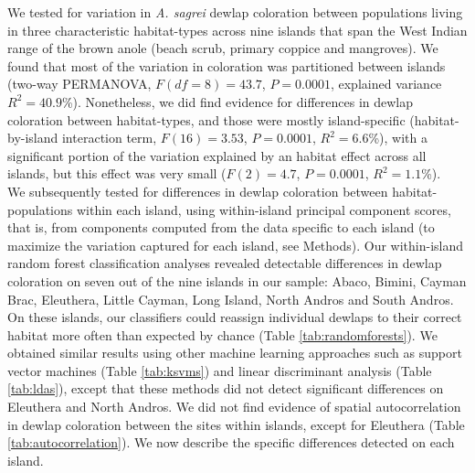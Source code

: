 
We tested for variation in \textit{A. sagrei} dewlap coloration between populations living in three characteristic habitat-types across nine islands that span the West Indian range of the brown anole (beach scrub, primary coppice and mangroves). We found that most of the variation in coloration was partitioned between islands (two-way PERMANOVA, $F(df = 8) = 43.7$, $P = 0.0001$, explained variance $R^2 = 40.9$\%). Nonetheless, we did find evidence for differences in dewlap coloration between habitat-types, and those were mostly island-specific (habitat-by-island interaction term, $F(16) = 3.53$, $P = 0.0001$, $R^2 = 6.6$\%), with a significant portion of the variation explained by an habitat effect across all islands, but this effect was very small ($F(2) = 4.7$, $P = 0.0001$, $R^2 = 1.1$\%).\\

We subsequently tested for differences in dewlap coloration between habitat-populations within each island, using within-island principal component scores, that is, from components computed from the data specific to each island (to maximize the variation captured for each island, see Methods). Our within-island random forest classification analyses revealed detectable differences in dewlap coloration on seven out of the nine islands in our sample: Abaco, Bimini, Cayman Brac, Eleuthera, Little Cayman, Long Island, North Andros and South Andros. On these islands, our classifiers could reassign individual dewlaps to their correct habitat more often than expected by chance (Table \ref{tab:randomforests}). We obtained similar results using other machine learning approaches such as support vector machines (Table \ref{tab:ksvms}) and linear discriminant analysis (Table \ref{tab:ldas}), except that these methods did not detect significant differences on Eleuthera and North Andros. We did not find evidence of spatial autocorrelation in dewlap coloration between the sites within islands, except for Eleuthera (Table \ref{tab:autocorrelation}). We now describe the specific differences detected on each island.\\

